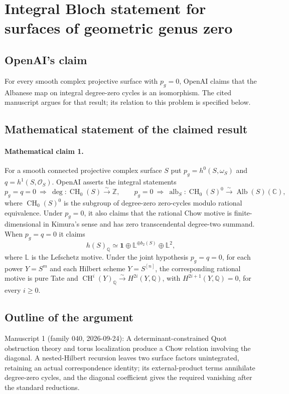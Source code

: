 \documentclass[11pt]{article}
\begin{document}
\section*{Integral Bloch statement for surfaces of geometric genus zero}

\subsection{OpenAI's claim}
For every smooth complex projective surface with $p_g=0$, OpenAI claims that the Albanese map on integral degree-zero cycles is an isomorphism. The cited manuscript argues for that result; its relation to this problem is specified below.

\subsection{Mathematical statement of the claimed result}
\paragraph{Mathematical claim 1.} For a smooth connected projective complex surface $S$ put $p_g=h^0(S,\omega_S)$ and $q=h^1(S,\mathcal O_S)$. OpenAI asserts the integral statements
\[
p_g=q=0\ \Longrightarrow\ \deg:\operatorname{CH}_0(S)\xrightarrow{\sim}\mathbb Z,
\qquad
p_g=0\ \Longrightarrow\ \operatorname{alb}_S:\operatorname{CH}_0(S)^0\xrightarrow{\sim}\operatorname{Alb}(S)(\mathbb C),
\]
where $\operatorname{CH}_0(S)^0$ is the subgroup of degree-zero zero-cycles modulo rational equivalence. Under $p_g=0$, it also claims that the rational Chow motive is finite-dimensional in Kimura's sense and has zero transcendental degree-two summand. When $p_g=q=0$ it claims
\[
h(S)_{\mathbb Q}\simeq\mathbf1\oplus\mathbb L^{\oplus b_2(S)}\oplus\mathbb L^2,
\]
where $\mathbb L$ is the Lefschetz motive. Under the joint hypothesis $p_g=q=0$, for each power $Y=S^m$ and each Hilbert scheme $Y=S^{[n]}$, the corresponding rational motive is pure Tate and $\operatorname{CH}^i(Y)_{\mathbb Q}\xrightarrow{\sim}H^{2i}(Y,\mathbb Q)$, with $H^{2i+1}(Y,\mathbb Q)=0$, for every $i\ge0$.

\subsection{Outline of the argument}
Manuscript 1 (family 040, 2026-09-24): A determinant-constrained Quot obstruction theory and torus localization produce a Chow relation involving the diagonal. A nested-Hilbert recursion leaves two surface factors unintegrated, retaining an actual correspondence identity; its external-product terms annihilate degree-zero cycles, and the diagonal coefficient gives the required vanishing after the standard reductions.
\end{document}
